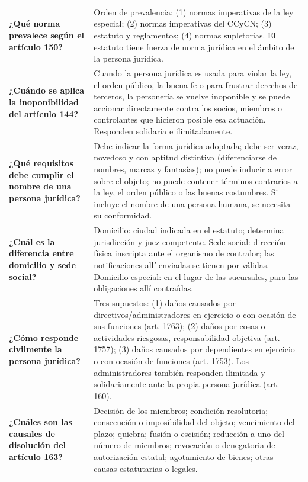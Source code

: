 \documentclass[12pt,oneside]{book}
\begin{document}
\begin{longtable}{
    >{\raggedright\arraybackslash}p{}
    >{\raggedright\arraybackslash}p{}
}
\textbf{¿Qué norma prevalece según el artículo 150?} &
Orden de prevalencia: (1) normas imperativas de la ley especial; (2) normas imperativas del CCyCN; (3) estatuto y reglamentos; (4) normas supletorias. El estatuto tiene fuerza de norma jurídica en el ámbito de la persona jurídica. \\[0.4em]

\textbf{¿Cuándo se aplica la inoponibilidad del artículo 144?} &
Cuando la persona jurídica es usada para violar la ley, el orden público, la buena fe o para frustrar derechos de terceros, la personería se vuelve inoponible y se puede accionar directamente contra los socios, miembros o controlantes que hicieron posible esa actuación. Responden solidaria e ilimitadamente. \\[0.4em]

\textbf{¿Qué requisitos debe cumplir el nombre de una persona jurídica?} &
Debe indicar la forma jurídica adoptada; debe ser veraz, novedoso y con aptitud distintiva (diferenciarse de nombres, marcas y fantasías); no puede inducir a error sobre el objeto; no puede contener términos contrarios a la ley, el orden público o las buenas costumbres. Si incluye el nombre de una persona humana, se necesita su conformidad. \\[0.4em]

\textbf{¿Cuál es la diferencia entre domicilio y sede social?} &
Domicilio: ciudad indicada en el estatuto; determina jurisdicción y juez competente. Sede social: dirección física inscripta ante el organismo de contralor; las notificaciones allí enviadas se tienen por válidas. Domicilio especial: en el lugar de las sucursales, para las obligaciones allí contraídas. \\[0.4em]

\textbf{¿Cómo responde civilmente la persona jurídica?} &
Tres supuestos: (1) daños causados por directivos/administradores en ejercicio o con ocasión de sus funciones (art. 1763); (2) daños por cosas o actividades riesgosas, responsabilidad objetiva (art. 1757); (3) daños causados por dependientes en ejercicio o con ocasión de funciones (art. 1753). Los administradores también responden ilimitada y solidariamente ante la propia persona jurídica (art. 160). \\[0.4em]

\textbf{¿Cuáles son las causales de disolución del artículo 163?} &
Decisión de los miembros; condición resolutoria; consecución o imposibilidad del objeto; vencimiento del plazo; quiebra; fusión o escisión; reducción a uno del número de miembros; revocación o denegatoria de autorización estatal; agotamiento de bienes; otras causas estatutarias o legales. \\[0.4em]


\end{longtable}
\end{document}
